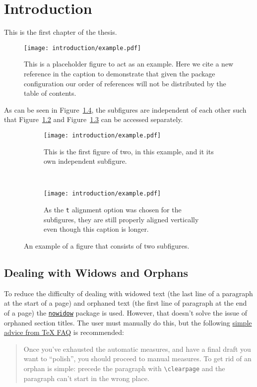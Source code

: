 \chapter{Introduction}\label{chapter:introduction}

This is the first chapter of the \gls{thesis}.~\cite{Aaboud:2016mmw,Bruning:782076}

\begin{figure}[htpb]
 \centering
 \texttt{[image: introduction/example.pdf]}
 \caption{This is a placeholder figure to act as an example.
  Here we cite a new reference in the caption to demonstrate that given the package configuration our order of references will not be distributed by the table of contents.~\cite{Higgs:1964ia}}\label{fig:test_figure}
\end{figure}

As can be seen in Figure~\ref{fig:subfigure_example}, the subfigures are independent of each other such that Figure~\ref{fig:subfigure_1} and Figure~\ref{fig:subfigure_2} can be accessed separately.

\begin{figure}[htbp]
 \centering
 \begin{subfigure}[t]{0.5\textwidth}
  \centering
  \texttt{[image: introduction/example.pdf]}
  \caption{This is the first figure of two, in this example, and it its own independent subfigure.}
  \label{fig:subfigure_1}
 \end{subfigure}%
 ~
 \begin{subfigure}[t]{0.5\textwidth}
  \centering
  \texttt{[image: introduction/example.pdf]}
  \caption{As the \texttt{t} alignment option was chosen for the subfigures, they are still properly aligned vertically even though this caption is longer.}
  \label{fig:subfigure_2}
 \end{subfigure}
 \caption{An example of a figure that consists of two subfigures.}
 \label{fig:subfigure_example}
\end{figure}

\section{Dealing with Widows and Orphans}

To reduce the difficulty of dealing with widowed text (the last line of a paragraph at the start of a page) and orphaned text (the first line of paragraph at the end of a page) the \href{https://ctan.org/pkg/nowidow?lang=en}{\texttt{nowidow}} package is used.
However, that doesn't solve the issue of orphaned section titles.
The user must manually do this, but the following \href{https://texfaq.org/FAQ-widows}{simple advice from \TeX{} FAQ} is recommended:

\begin{quote}
 Once you've exhausted the automatic measures, and have a final draft you want to ``polish'', you should proceed to manual measures.
 To get rid of an orphan is simple: precede the paragraph with \texttt{\textbackslash clearpage} and the paragraph can’t start in the wrong place.
\end{quote}
